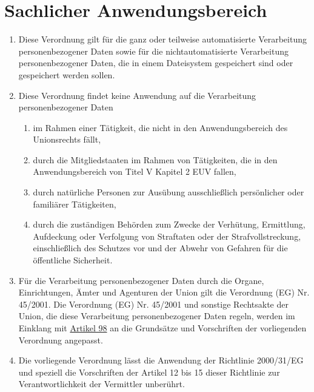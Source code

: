 \chapter{Sachlicher Anwendungsbereich}
\label{ch:02}


\begin{enumerate}

  \item Diese Verordnung gilt für die ganz oder teilweise automatisierte Verarbeitung personenbezogener Daten sowie für
   die nichtautomatisierte Verarbeitung personenbezogener Daten, die in einem Dateisystem gespeichert sind oder
   gespeichert werden sollen.
  \label{itm:02-1}

  \item Diese Verordnung findet keine Anwendung auf die Verarbeitung personenbezogener Daten
  \label{itm:02-2}

  \begin{enumerate}
  
    \item im Rahmen einer Tätigkeit, die nicht in den Anwendungsbereich des Unionsrechts fällt,
    \label{itm:02-2a}

    \item durch die Mitgliedstaaten im Rahmen von Tätigkeiten, die in den Anwendungsbereich von Titel V Kapitel 2
     EUV fallen,
    \label{itm:02-2b}

    \item durch natürliche Personen zur Ausübung ausschließlich persönlicher oder familiärer Tätigkeiten,
    \label{itm:02-2c}

    \item durch die zuständigen Behörden zum Zwecke der Verhütung, Ermittlung, Aufdeckung oder Verfolgung von Straftaten
     oder der Strafvollstreckung, einschließlich des Schutzes vor und der Abwehr von Gefahren für die öffentliche
     Sicherheit.
    \label{itm:02-2d}

  \end{enumerate}

  \item Für die Verarbeitung personenbezogener Daten durch die Organe, Einrichtungen, Ämter und Agenturen der Union gilt
   die Verordnung (EG) Nr. 45/2001. Die Verordnung (EG) Nr. 45/2001 und sonstige Rechtsakte der Union, die diese
   Verarbeitung personenbezogener Daten regeln, werden im Einklang mit \hyperref[ch:98]{Artikel 98} an
   die Grundsätze und Vorschriften der vorliegenden Verordnung angepasst.
  \label{itm:02-3}

  \item Die vorliegende Verordnung lässt die Anwendung der Richtlinie 2000/31/EG und speziell die Vorschriften der
   Artikel 12 bis 15 dieser Richtlinie zur Verantwortlichkeit der Vermittler unberührt.
  \label{itm:02-4}

\end{enumerate}

